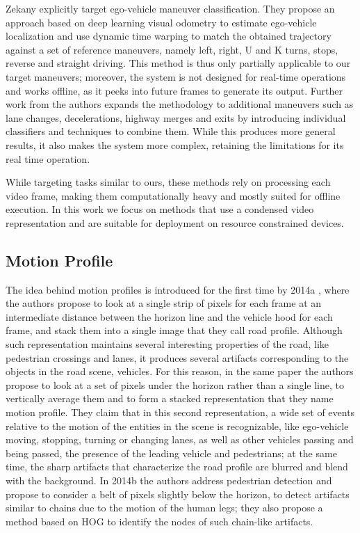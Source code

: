 Zekany \etal \cite{zekany2019classifying} explicitly target ego-vehicle maneuver classification. They propose an approach based on deep learning visual odometry to estimate ego-vehicle localization and use dynamic time warping to match the obtained trajectory against a set of reference maneuvers, namely left, right, U and K turns, stops, reverse and straight driving. This method is thus only partially applicable to our target maneuvers; moreover, the system is not designed for real-time operations and works offline, as it peeks into future frames to generate its output. Further work from the authors \cite{zekany2022finding} expands the methodology to additional maneuvers such as lane changes, decelerations, highway merges and exits by introducing individual classifiers and techniques to combine them. While this produces more general results, it also makes the system more complex, retaining the limitations for its real time operation.

While targeting tasks similar to ours, these methods rely on processing each video frame, making them computationally heavy and mostly suited for offline execution. In this work we focus on methods that use a condensed video representation and are suitable for deployment on resource constrained devices.

\subsection{Motion Profile}

The idea behind motion profiles is introduced for the first time by \kilicarslan \etal 2014a \cite{kilicarslan2014visualizing},
where the authors propose to look at a single strip of pixels for each frame at an intermediate distance between the horizon line and the vehicle hood for each frame, 
and stack them into a single image that they call road profile.
Although such representation maintains several interesting properties of the road, like pedestrian crossings and lanes, it produces several artifacts corresponding to the objects in the road scene, \eg vehicles.
For this reason, in the same paper the authors propose to look at a set of pixels under the horizon rather than a single line, to vertically average them and to form a stacked representation that they name motion profile.
They claim that in this second representation, a wide set of events relative to the motion of the entities in the scene is recognizable, 
like ego-vehicle moving, stopping, turning or changing lanes, 
as well as other vehicles passing and being passed, the presence of the leading vehicle and pedestrians; at the same time, the sharp artifacts that characterize the road profile are blurred and blend with the background.
In \kilicarslan \etal 2014b \cite{kilicarslan2014detecting} the authors address pedestrian detection and propose to consider a belt of pixels slightly below the horizon, to detect artifacts similar to chains due to the motion of the human legs; they also propose a method based on HOG to identify the nodes of such chain-like artifacts.

